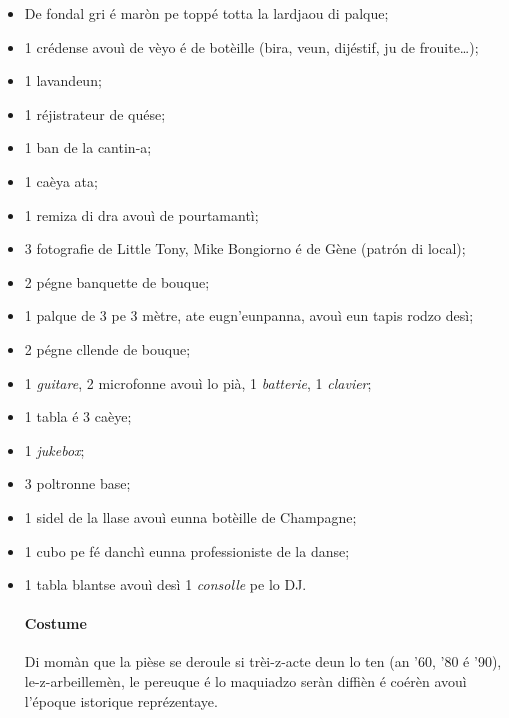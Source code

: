 \Scenographie
\begin{itemize}
\item[$\bullet$] De fondal gri é maròn pe toppé totta la lardjaou di palque;
\item[$\bullet$] 1 crédense avouì de vèyo é de botèille (bira, veun, dijéstif, ju de frouite\ldots);
\item[$\bullet$] 1 lavandeun;
\item[$\bullet$] 1 réjistrateur de quése;
\item[$\bullet$] 1 ban de la cantin-a;
\item[$\bullet$] 1 caèya ata;
\item[$\bullet$] 1 remiza di dra avouì de pourtamantì;
\item[$\bullet$] 3 fotografie de Little Tony, Mike Bongiorno é de Gène (patr\'on di local);
\item[$\bullet$] 2 pégne banquette de bouque;
\item[$\bullet$] 1 palque de 3 pe 3 mètre, ate eugn'eunpanna, avouì eun tapis rodzo desì;
\item[$\bullet$] 2 pégne cllende de bouque;
\item[$\bullet$] 1 \textit{guitare}, 2 microfonne avouì lo pià, 1 \textit{batterie}, 1 \textit{clavier};
\item[$\bullet$] 1 tabla é 3 caèye;
\item[$\bullet$] 1 \textit{jukebox};
\item[$\bullet$] 3 poltronne base;
\item[$\bullet$] 1 sidel de la llase avouì eunna botèille de Champagne;
\item[$\bullet$] 1 cubo pe fé danchì eunna professioniste de la danse;
\item[$\bullet$] 1 tabla blantse avouì desì 1 \textit{consolle} pe lo DJ. 

\paragraph*{Costume} Di momàn que la pièse se deroule si trèi-z-acte deun lo ten (an '60, '80 é '90), le-z-arbeillemèn, le pereuque é lo maquiadzo seràn diffièn é coérèn avouì l'époque istorique reprézentaye.

\end{itemize}

\setlength{\lengthchar}{2.50cm}



